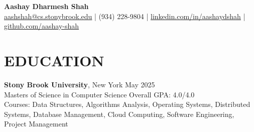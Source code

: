 \documentclass[a4paper,9pt]{extarticle}
\begin{document}
\pagestyle{empty}

\begin{center}
\textbf{\Large Aashay Dharmesh Shah}\\[2pt]
\href{mailto:aashshah@cs.stonybrook.edu}{aashshah@cs.stonybrook.edu} | (934) 228-9804 | \href{linkedin.com/in/aashaydshah}{linkedin.com/in/aashaydshah} | \href{github.com/aashay-shah}{github.com/aashay-shah}
\end{center}
\section*{EDUCATION}\noindent
    \noindent
    \textbf{Stony Brook University}, New York \hfill May 2025\\
    Masters of Science in Computer Science \hfill Overall GPA: 4.0/4.0 \\
    Courses: Data Structures, Algorithms Analysis, Operating Systems, Distributed Systems, Database Management, Cloud Computing, Software Engineering, Project Management
    \\
    \\
    
    \vspace{-1cm}
    
\end{document}

